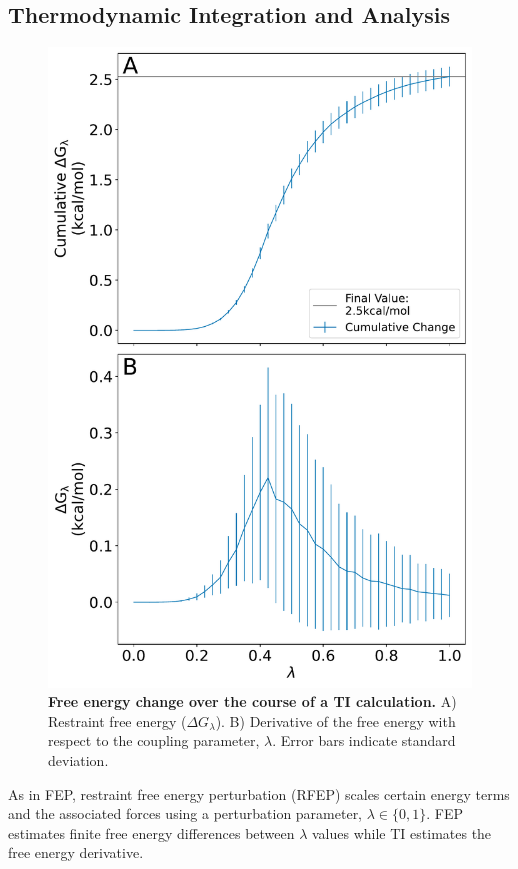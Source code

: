 \documentclass[9pt,tutorial]{Styling/livecoms}
\begin{document}
\subsection{Thermodynamic Integration and Analysis}

\begin{figure}[!htb]
    \includegraphics[width=0.95\linewidth]{RFEP}
    \caption{ \textbf{Free energy change over the course of a TI calculation.} A) Restraint free energy ($\Delta G_\lambda$). B) Derivative of the free energy with respect to the coupling parameter, $\lambda$. Error bars indicate standard deviation.
    }\label{fig:RFEP2}
\end{figure}
As in FEP, restraint free energy perturbation (RFEP) scales certain energy terms and the associated forces using a perturbation parameter, $\lambda\in \{0,1\}$.
FEP estimates finite free energy differences between $\lambda$ values while TI estimates the free energy derivative. 
\end{document}

